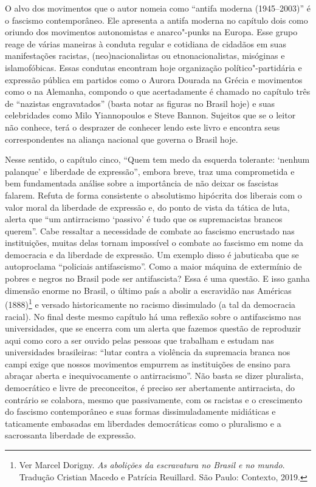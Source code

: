 O alvo dos movimentos que o autor nomeia como ``antifa moderna
(1945--2003)'' é o fascismo contemporâneo. Ele apresenta a antifa
moderna no capítulo dois como oriundo dos movimentos autonomistas e
anarco"-punks na Europa. Esse grupo reage de várias maneiras à conduta
regular e cotidiana de cidadãos em suas manifestações racistas,
(neo)nacionalistas ou etnonacionalistas, misóginas e islamofóbicas.
Essas condutas encontram hoje organização político"-partidária e
expressão pública em partidos como o Aurora Dourada na Grécia e
movimentos como o  na Alemanha, compondo o que acertadamente é
chamado no capítulo três de ``nazistas engravatados'' (basta notar as
figuras no Brasil hoje) e suas celebridades como Milo Yiannopoulos e
Steve Bannon. Sujeitos que se o leitor não conhece, terá o desprazer de
conhecer lendo este livro e encontra seus correspondentes na aliança
nacional que governa o Brasil hoje.

Nesse sentido, o capítulo cinco, ``Quem tem medo da esquerda tolerante:
`nenhum palanque' e liberdade de expressão'', embora breve, traz uma
comprometida e bem fundamentada análise sobre a importância de não
deixar os fascistas falarem. Refuta de forma consistente o absolutismo
hipócrita dos liberais com o valor moral da liberdade de expressão e, do
ponto de vista da tática de luta, alerta que ``um antirracismo `passivo'
é tudo que os supremacistas brancos querem''. Cabe ressaltar a
necessidade de combate ao fascismo encrustado nas instituições, muitas
delas tornam impossível o combate ao fascismo em nome da democracia e da
liberdade de expressão. Um exemplo disso é jabuticaba que se
autoproclama ``policiais antifascismo''. Como a maior máquina de
extermínio de pobres e negros no Brasil pode ser antifascista? Essa é uma
questão. E isso ganha dimensão enorme no Brasil, o último país a abolir
a escravidão nas Américas (1888)\footnote{Ver Marcel Dorigny. \emph{As
  abolições da escravatura no Brasil e no mundo}. Tradução Cristian
  Macedo e Patrícia Reuillard. São Paulo: Contexto, 2019.} e versado
historicamente no racismo dissimulado (a tal da democracia racial). No
final deste mesmo capítulo há uma reflexão sobre o antifascismo nas
universidades, que se encerra com um alerta que fazemos questão de
reproduzir aqui como coro a ser ouvido pelas pessoas que trabalham e
estudam nas universidades brasileiras: ``lutar contra a violência da
supremacia branca nos campi exige que nossos movimentos empurrem as
instituições de ensino para abraçar aberta e inequivocamente o
antirracismo''. Não basta se dizer pluralista, democrático e livre de
preconceitos, é preciso ser abertamente antirracista, do contrário se
colabora, mesmo que passivamente, com os racistas e o crescimento do
fascismo contemporâneo e suas formas dissimuladamente midiáticas e
taticamente embasadas em liberdades democráticas como o pluralismo e a
sacrossanta liberdade de expressão.

